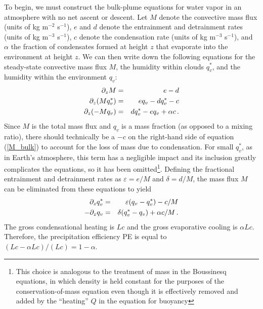 \documentclass[12pt]{article}
\begin{document}
To begin, we must construct the bulk-plume equations for water vapor in an atmosphere with no net ascent or descent.  Let $M$ denote the convective mass flux (units of kg m$^{-2}$ s$^{-1}$), $e$ and $d$ denote the entrainment and detrainment rates (units of kg m$^{-3}$ s$^{-1}$), $c$ denote the condensation rate (units of kg m$^{-3}$ s$^{-1}$), and $\alpha$ the fraction of condensates formed at height $z$ that evaporate into the environment at height $z$.  We can then write down the following equations for the steady-state convective mass flux $M$, the humidity within clouds $q_v^*$, and the humidity within the environment $q_v$:
\begin{eqnarray}
\partial_z M &=& e - d \label{M_bulk} \\
\partial_z (M q_v^*) &=& e q_v - d q_v^* - c \label{qvs_bulk_1} \\
\partial_z (-M q_v) &=& d q_v^* - e q_v + \alpha c \, . \label{qv_bulk_1}
\end{eqnarray}
Since $M$ is the total mass flux and $q_v$ is a mass fraction (as opposed to a mixing ratio), there should technically be a $-c$ on the right-hand side of equation (\ref{M_bulk}) to account for the loss of mass due to condensation.  For small $q_v^*$, as in Earth's atmosphere, this term has a negligible impact and its inclusion greatly complicates the equations, so it has been omitted\footnote{This choice is analogous to the treatment of mass in the Boussinesq equations, in which density is held constant for the purposes of the conservation-of-mass equation even though it is effectively removed and added by the ``heating'' $Q$ in the equation for buoyancy}.   Defining the fractional entrainment and detrainment rates as $\varepsilon = e/M$ and $\delta = d/M$, the mass flux $M$ can be eliminated from these equations to yield
\begin{eqnarray}
\partial_z q_v^* &=& \varepsilon (q_v - q_v^*) - c/M \label{qvs_bulk_2} \\
- \partial_z q_v &=& \delta (q_v^* - q_v) + \alpha c / M \, . \label{qv_bulk_2}
\end{eqnarray}
The gross condensational heating is $Lc$ and the gross evaporative cooling is $\alpha Lc$.  Therefore, the precipitation efficiency PE is equal to $(Lc-\alpha Lc)/(Lc) = 1-\alpha$.
\end{document}
